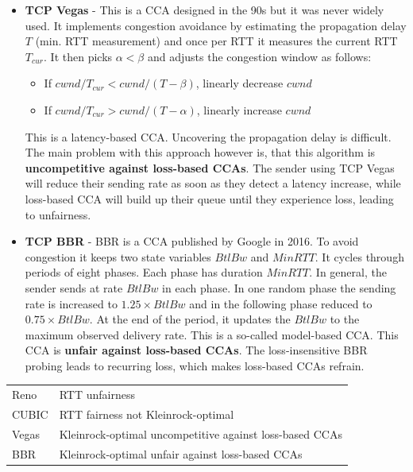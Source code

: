 \begin{itemize}
\item \textbf{TCP Vegas} - This is a CCA designed in the 90s but it was never widely used. It implements congestion avoidance by estimating the propagation delay $T$ (min. RTT measurement) and once per RTT it measures the current RTT $T_{cur}$. It then picks $\alpha < \beta$ and adjusts the congestion window as follows:
\begin{itemize}
\item If $cwnd/T_{cur} < cwnd/(T - \beta)$, linearly decrease $cwnd$
\item If $cwnd/T_{cur} > cwnd/(T - \alpha)$, linearly increase $cwnd$
\end{itemize}
This is a latency-based CCA. Uncovering the propagation delay is difficult. The main problem with this approach however is, that this algorithm is \textbf{uncompetitive against loss-based CCAs}. The sender using TCP Vegas will reduce their sending rate as soon as they detect a latency increase, while loss-based CCA will build up their queue until they experience loss, leading to unfairness.
\item \textbf{TCP BBR} - BBR is a CCA published by Google in 2016. To avoid congestion it keeps two state variables $BtlBw$ and $MinRTT$. It cycles through periods of eight phases. Each phase has duration $MinRTT$. In general, the sender sends at rate $BtlBw$ in each phase. In one random phase the sending rate is increased to $1.25 \times BtlBw$ and in the following phase reduced to $0.75 \times BtlBw$. At the end of the period, it updates the $BtlBw$ to the maximum observed delivery rate. This is a so-called model-based CCA. This CCA is \textbf{unfair against loss-based CCAs}. The loss-insensitive BBR probing leads to recurring loss, which makes loss-based CCAs refrain.
\end{itemize}
\begin{table}[H]
\centering
\begin{tabular}{p{2cm}p{8cm}}
\rule{0pt}{4ex} Reno & RTT unfairness \\
\rule{0pt}{4ex}  CUBIC & RTT fairness \newline not Kleinrock-optimal  \\
\rule{0pt}{4ex}  Vegas & Kleinrock-optimal \newline uncompetitive against loss-based CCAs \\
\rule{0pt}{4ex}  BBR & Kleinrock-optimal \newline unfair against loss-based CCAs
\end{tabular}
\end{table}

